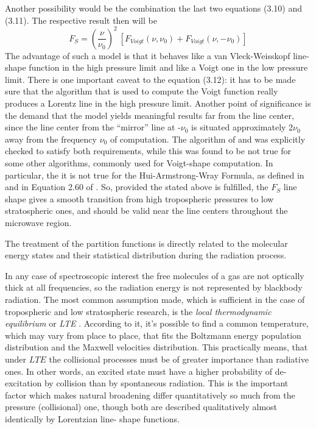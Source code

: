 Another possibility would be the combination the last two equations
(3.10) and (3.11). The respective result then will be 
\begin{equation}
 F_S=\left(\frac{\nu}{\nu_0}\right)^2~[F_{Voigt}(\nu,\nu_0)+F_{Voigt}(\nu,-\nu_0)]
\end{equation}
The advantage of such a model is that it behaves like a van
Vleck-Weisskopf line-shape function in the high pressure limit and
like a Voigt one in the low pressure limit. There is one important
caveat to the equation (3.12): it has to be made sure that the
algorithm that is used to compute the Voigt function really produces a
Lorentz line in the high pressure limit. Another point of significance
is the demand that the model yields meaningful results far from the
line center, since the line center from the ``mirror'' line at
-$\nu_0$ is situated approximately 2$\nu_0$ away from the frequency
$\nu_0$ of computation. The algorithm of \citet{Drayson:76} and
\citet{Oliveiro:77} was explicitly checked to satisfy both
requirements, while this was found to be not true for some other
algorithms, commonly used for Voigt-shape computation. In particular,
the it is not true for the Hui-Armstrong-Wray Formula, as defined in
\citet{hui:78} and in Equation 2.60 of \citet{pwr:93}. So, provided
the stated above is fulfilled, the $F_S$ line shape gives a smooth
transition from high tropospheric pressures to low stratospheric ones,
and should be valid near the line centers throughout the microwave region.







The treatment of the partition functions is directly related to the molecular
energy states and their statistical distribution during the
radiation process. 

In any case of spectroscopic interest the free molecules of a gas are
not optically thick at all frequencies, so the radiation energy is not
represented by blackbody radiation. The most common assumption made,
which is sufficient in the case of tropospheric and low stratospheric
research, is the {\textit{local thermodynamic equilibrium}\nocorr} or
{\textit{LTE }\nocorr}. According to it, it's possible to find a common temperature,
which may vary from place to place, that fits the Boltzmann energy
population distribution and the Maxwell velocities distribution.
This practically means, that under $LTE$ the collisional processes
must be of greater importance than radiative ones. In other words,
an excited state must have a higher probability of de-excitation by
collision than by spontaneous radiation. This is the important
factor which makes natural broadening differ quantitatively so much
from the pressure (collisional) one, though both are described
qualitatively almost identically by Lorentzian line- shape
functions.

